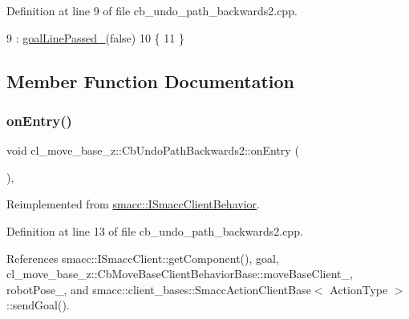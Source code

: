 Definition at line 9 of file cb\+\_\+undo\+\_\+path\+\_\+backwards2.\+cpp.


\begin{DoxyCode}
9                                            : \hyperlink{classcl__move__base__z_1_1CbUndoPathBackwards2_a1c037317330c74b60660548f09a01749}{goalLinePassed\_}(\textcolor{keyword}{false})
10 \{
11 \}
\end{DoxyCode}


\subsection{Member Function Documentation}
\mbox{\label{classcl__move__base__z_1_1CbUndoPathBackwards2_a1b96187df9be6ce0fbdb5511147685d3}} 
\subsubsection{\texorpdfstring{on\+Entry()}{onEntry()}}
{\footnotesize\ttfamily void cl\+\_\+move\+\_\+base\+\_\+z\+::\+Cb\+Undo\+Path\+Backwards2\+::on\+Entry (\begin{DoxyParamCaption}{ }\end{DoxyParamCaption})\hspace{0.3cm}{\ttfamily [override]}, {\ttfamily [virtual]}}



Reimplemented from \hyperlink{classsmacc_1_1ISmaccClientBehavior_a9877684b1954429719826e2d0924d980}{smacc\+::\+I\+Smacc\+Client\+Behavior}.



Definition at line 13 of file cb\+\_\+undo\+\_\+path\+\_\+backwards2.\+cpp.



References smacc\+::\+I\+Smacc\+Client\+::get\+Component(), goal, cl\+\_\+move\+\_\+base\+\_\+z\+::\+Cb\+Move\+Base\+Client\+Behavior\+Base\+::move\+Base\+Client\+\_\+, robot\+Pose\+\_\+, and smacc\+::client\+\_\+bases\+::\+Smacc\+Action\+Client\+Base$<$ Action\+Type $>$\+::send\+Goal().


